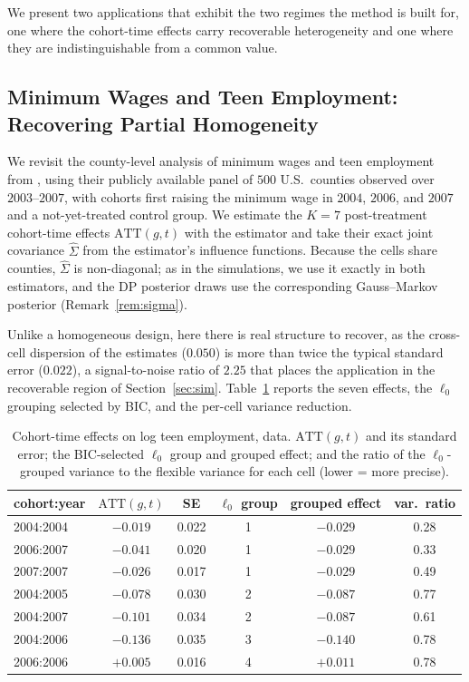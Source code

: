 \documentclass[margin=5in, 12pt]{article}
\newcommand{\1}{\mathbbm{1}}
\begin{document}
We present two applications that exhibit the two regimes the method is built for, one where the cohort-time effects carry recoverable heterogeneity and one where they are indistinguishable from a common value.

\subsection{Minimum Wages and Teen Employment: Recovering Partial Homogeneity}
\label{sec:cs_application}

We revisit the county-level analysis of minimum wages and teen employment from
\citet{callaway2021}, using their publicly available panel of $500$ U.S.\
counties observed over $2003$--$2007$, with cohorts first raising the minimum
wage in $2004$, $2006$, and $2007$ and a not-yet-treated control group. We
estimate the $K=7$ post-treatment cohort-time effects $\mathrm{ATT}(g,t)$ with the
\citet{callaway2021} estimator and take their exact joint covariance
$\hat\Sigma$ from the estimator's influence functions. Because the cells share
counties, $\hat\Sigma$ is non-diagonal; as in the simulations, we use it exactly
in both estimators, and the DP posterior draws use the corresponding
Gauss--Markov posterior (Remark~\ref{rem:sigma}).

Unlike a homogeneous design, here there is real structure to recover, as the
cross-cell dispersion of the estimates ($0.050$) is more than twice the typical
standard error ($0.022$), a signal-to-noise ratio of $2.25$ that places the
application in the recoverable region of Section~\ref{sec:sim}.
Table~\ref{tab:cs} reports the seven effects, the $\ell_0$ grouping selected by
BIC, and the per-cell variance reduction.

\begin{table}[H]
    \centering
    \caption{Cohort-time effects on log teen employment, \citet{callaway2021}
    data. $\mathrm{ATT}(g,t)$ and its standard error; the BIC-selected $\ell_0$
    group and grouped effect; and the ratio of the $\ell_0$-grouped variance to
    the flexible variance for each cell (lower = more precise).}
    \label{tab:cs}
    \small
    \begin{tabular}{lccccc}
        \toprule
        cohort:year & $\mathrm{ATT}(g,t)$ & SE & $\ell_0$ group & grouped effect & var.\ ratio \\
        \midrule
        2004:2004 & $-0.019$ & 0.022 & 1 & $-0.029$ & 0.28 \\
        2006:2007 & $-0.041$ & 0.020 & 1 & $-0.029$ & 0.33 \\
        2007:2007 & $-0.026$ & 0.017 & 1 & $-0.029$ & 0.49 \\
        2004:2005 & $-0.078$ & 0.030 & 2 & $-0.087$ & 0.77 \\
        2004:2007 & $-0.101$ & 0.034 & 2 & $-0.087$ & 0.61 \\
        2004:2006 & $-0.136$ & 0.035 & 3 & $-0.140$ & 0.78 \\
        2006:2006 & $+0.005$ & 0.016 & 4 & $+0.011$ & 0.78 \\
        \bottomrule
    \end{tabular}
\end{table}
\end{document}
